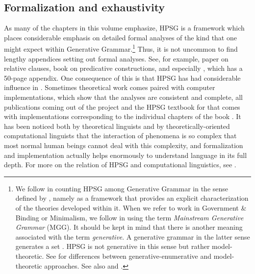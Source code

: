 \documentclass[output=paper
 	        ,biblatex
                ,babelshorthands
                ,newtxmath
                ,draftmode
                ,colorlinks, citecolor=brown
]{langscibook}
\begin{document}
\subsection{Formalization and exhaustivity}
\label{sec-form-exhaust}

As many of the chapters in this volume emphasize, HPSG is a framework which places considerable
emphasis on detailed formal analyses of the kind that one might expect within Generative
Grammar.\footnote{%
We follow \citet[]{GSag2000a-u} in counting HPSG among Generative Grammar in the sense
defined by \citet[]{Chomsky65a}, namely as a framework that provides an explicit
characterization of the theories developed within it.
When we refer to work in Government \& Binding or Minimalism, we follow \citet[]{CJ2005a} in using
the term \emph{Mainstream Generative Grammar} (MGG). It should be kept in mind that there is another
meaning associated with the term \emph{generative}. A generative grammar in the latter sense
generates a set \citep[]{Chomsky57a}. HPSG is not generative in this sense but rather model-theoretic. See \citet{PS2001a}
for differences between generative-enumerative and model-theoretic approaches. See also
 and .
}
Thus, it is not uncommon to find lengthy appendices setting out formal analyses. See, for
example,  paper on  relative clauses,
 book on predicative constructions, and especially \citet{GSag2000a-u},
which has a 50-page appendix. One consequence of this is that HPSG has had 
considerable influence in . Sometimes theoretical work comes paired
with computer implementations, which show that the analyses are consistent and complete, \eg all
publications coming out of the  project \citep{MuellerCoreGram} and the HPSG textbook
for  that comes with implementations corresponding to the individual chapters of the book
\citep{MuellerGrammix}. It has been noticed both by theoretical linguists \citep[]{Bierwisch63a} and
by theoretically-oriented computational linguists \citep[]{Abney96a} that the interaction of phenomena
is so complex that most normal human beings cannot deal with this complexity, and formalization and
implementation actually helps enormously to understand language in its full depth. For more on the
relation of HPSG and computational linguistics, see .
\end{document}
